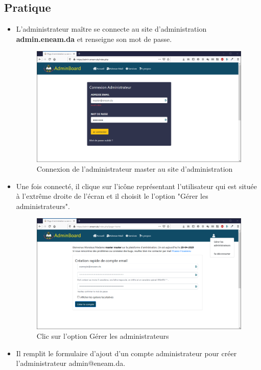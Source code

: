 \documentclass[a4paper,12pt,french]{report} %
\begin{document}
\subsection{Pratique}
\begin{itemize}
\item L'administrateur maître se connecte au site d'administration \textbf{admin.eneam.da} et renseigne son mot de passe.
\begin{figure}[H]
	\centering
	\includegraphics[width=483pt]{figure/connexion_master_admin.png}
	\caption{Connexion de l'administrateur master au site d'administration}
\end{figure}
\item Une fois connecté, il clique sur l'icône représentant l'utilisateur qui est située à l'extrême droite de l'écran et il choisit  le l'option "Gérer les administrateurs". 
\begin{figure}[H]
	\centering
	\includegraphics[width=483pt]{figure/gestion_administrateur_compte.png}
	\caption{Clic sur l'option Gérer les administrateurs}
\end{figure}
\item Il remplit le formulaire d'ajout d'un compte administrateur pour créer l'administrateur admin@eneam.da.

\end{itemize}
\end{document}
